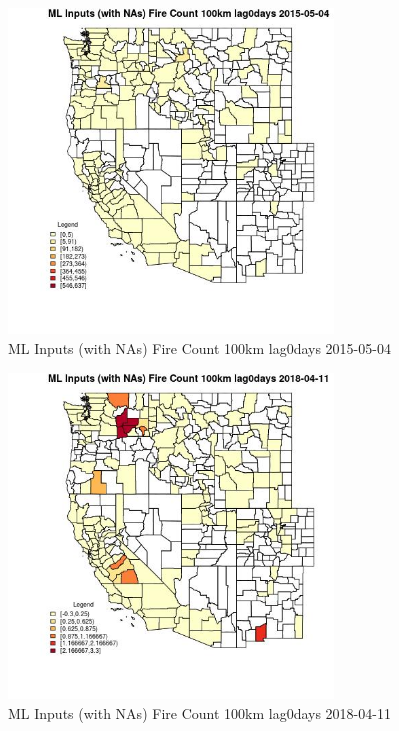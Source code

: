\begin{figure} 
\centering  
\includegraphics[width=0.77\textwidth]{Code_Outputs/Report_ML_input_PM25_Step4_part_e_de_duplicated_aves_compiled_2019-05-18wNAs_CountyFire_Count_100km_lag0daysMean2015-05-04.jpg} 
\caption{\label{fig:Report_ML_input_PM25_Step4_part_e_de_duplicated_aves_compiled_2019-05-18wNAsCountyFire_Count_100km_lag0daysMean2015-05-04}ML Inputs (with NAs) Fire Count 100km lag0days 2015-05-04} 
\end{figure} 
 

\begin{figure} 
\centering  
\includegraphics[width=0.77\textwidth]{Code_Outputs/Report_ML_input_PM25_Step4_part_e_de_duplicated_aves_compiled_2019-05-18wNAs_CountyFire_Count_100km_lag0daysMean2018-04-11.jpg} 
\caption{\label{fig:Report_ML_input_PM25_Step4_part_e_de_duplicated_aves_compiled_2019-05-18wNAsCountyFire_Count_100km_lag0daysMean2018-04-11}ML Inputs (with NAs) Fire Count 100km lag0days 2018-04-11} 
\end{figure} 
 

